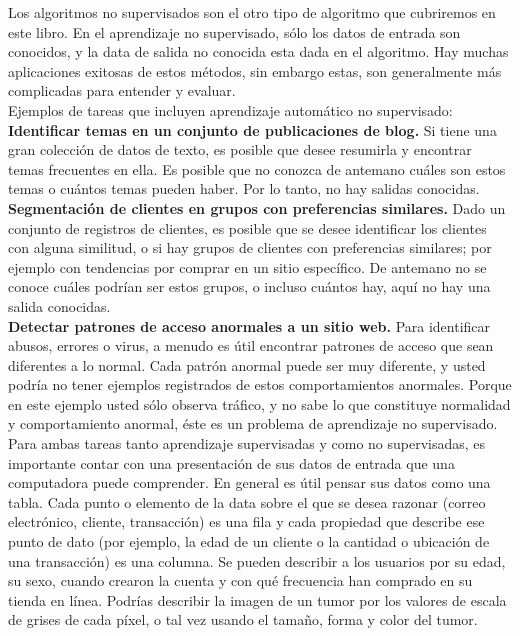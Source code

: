 
Los algoritmos no supervisados son el otro tipo de algoritmo que cubriremos en este libro. En el aprendizaje no supervisado, sólo los datos de entrada son conocidos, y la data de salida no conocida esta dada en el algoritmo. Hay muchas aplicaciones exitosas de estos métodos, sin embargo estas, son generalmente más complicadas para entender y evaluar.\\



Ejemplos de tareas que incluyen aprendizaje automático no supervisado:\\


{\bf{Identificar temas en un conjunto de publicaciones de  blog.}}
Si tiene una gran colección de datos de texto, es posible que desee resumirla y encontrar temas frecuentes en ella.  Es posible que no conozca de antemano cuáles son estos temas o cuántos temas pueden haber. Por lo tanto, no hay salidas conocidas.\\


{\bf{Segmentación de clientes en grupos con preferencias similares.}}
Dado un conjunto de registros de clientes, es posible que se desee identificar los clientes con alguna similitud, o  si hay grupos de clientes con preferencias similares; por ejemplo con tendencias por comprar en un sitio específico. De antemano no se conoce cuáles podrían ser estos grupos, o incluso cuántos hay,  aquí no hay una salida conocidas.\\



{\bf{Detectar patrones de acceso anormales a un sitio web.}}
Para identificar abusos, errores o virus, a menudo es útil encontrar patrones de acceso que sean diferentes a lo normal. Cada patrón anormal puede ser muy diferente, y usted podría no tener ejemplos registrados de estos comportamientos anormales.  Porque en este ejemplo usted sólo observa tráfico, y no sabe lo que constituye normalidad y comportamiento anormal, éste es un problema de aprendizaje no supervisado. \\


Para ambas  tareas tanto aprendizaje supervisadas y como no supervisadas, es importante contar con una presentación de sus datos de entrada que una computadora puede comprender.  En general es  útil pensar sus datos como una tabla.  Cada punto o elemento de la data sobre el que se desea razonar (correo electrónico, cliente, transacción) es una fila y cada propiedad que describe ese punto de dato (por ejemplo, la edad de un cliente o la cantidad o ubicación de una transacción) es una columna. Se pueden describir a los usuarios por su edad, su sexo, cuando crearon la cuenta y con qué frecuencia han comprado en su tienda en línea. 
Podrías describir la imagen de un tumor por los valores de escala de grises de cada píxel, o tal vez usando el tamaño, forma y color del tumor.\\



